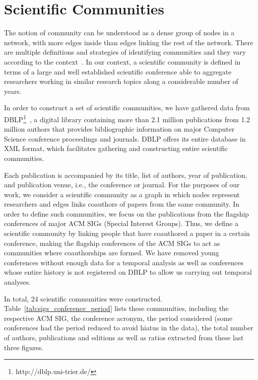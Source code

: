 \section{Scientific Communities}


The notion of community can be understood as a dense group of nodes in a network, with more edges inside than edges linking the rest of the network.  There are multiple definitions
and strategies of identifying communities and they vary according to the context~\cite{Kleinberg@cacm2008,Leskovec@www2010}. In our context, a scientific community is defined in terms of a large and well established
scientific conference able to aggregate researchers working in similar research topics along a considerable number of years. 


In order to construct a set of scientific communities, we have gathered data from DBLP\footnote{http://dblp.uni-trier.de/}~\cite{Ley:2009}, a digital library containing more
than 2.1 million publications from 1.2 million authors that provides bibliographic information on major Computer Science conference proceedings and journals.  DBLP offers its
entire database in XML format, which facilitates gathering and constructing entire scientific communities. 

Each publication is accompanied by its title, list of authors, year of publication, and publication venue, i.e., the conference or journal. For the purposes of our work, we
consider a scientific community as a graph in which nodes represent researchers and edges links coauthors of papers from the same community.  In order to define such communities,
we focus on the publications from the flagship conferences of major ACM SIGs (Special Interest Groups).  Thus, we define a scientific community by linking people that have
coauthored a paper in a certain conference, making the flagship conferences of the ACM SIGs to act as communities where coauthorships are formed. We have removed young conferences
without enough data for a temporal analysis as well as conferences whose entire history is not registered on DBLP to allow us carrying out temporal analyses. 

In total, 24 scientific communities were constructed. Table~\ref{tab:sigs_conference_period} lists these communities, including the respective ACM SIG, the conference acronym, the period
considered (some conferences had the period reduced to avoid hiatus in the data), the total number of authors, publications and editions as well as ratios extracted from these last three figures.

